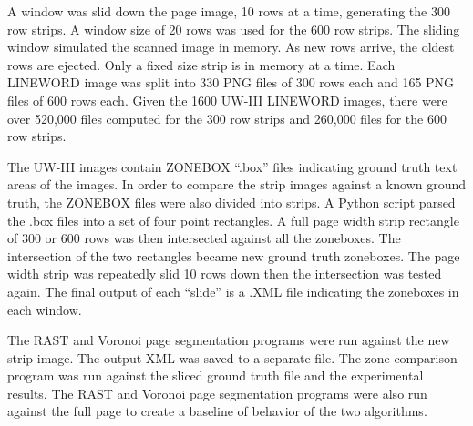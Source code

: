 \documentclass[conference]{IEEEtran}
\begin{document}

A window was slid down the page image, 10 rows at a time, generating the 300
row strips. A window size of 20 rows was used for the 600 row strips.  The
sliding window simulated the scanned image in memory. As new rows arrive, the
oldest rows are ejected. Only a fixed size strip is in memory at a time. Each
LINEWORD image was split into 330 PNG files of 300 rows each and 165 PNG files
of 600 rows each.  Given the 1600 UW-III LINEWORD images, there were over
520,000 files computed for the 300 row strips and 260,000 files for the 600 row
strips.

The UW-III images contain ZONEBOX “.box” files indicating ground truth text
areas of the images. In order to compare the strip images against a known
ground truth, the ZONEBOX files were also divided into strips. A Python script
parsed the .box files into a set of four point rectangles. A full page width
strip rectangle of 300 or 600 rows was then intersected against all the
zoneboxes. The intersection of the two rectangles became new ground truth
zoneboxes. The page width strip was repeatedly slid 10 rows down then the
intersection was tested again. The final output of each “slide” is a .XML file
indicating the zoneboxes in each window.

The RAST and Voronoi page segmentation programs were run against the new strip
image. The output XML was saved to a separate file. The zone comparison program
was run against the sliced ground truth file and the experimental results. The
RAST and Voronoi page segmentation programs were also run against the full page
to create a baseline of behavior of the two algorithms.  

\end{document}
